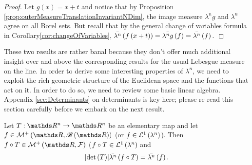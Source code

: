 \begin{proof}
Let $g\left(x\right)=x+t$ and notice that by Proposition \ref{prop:outerMeasureTranslationInvariantNDim},
the image measure $\lambda^{n}g$ and $\lambda^{n}$ agree on all
Borel sets. But recall that by the general change of variables formula
in Corollary\ref{cor:changeOfVariables}, $\bar{\lambda^{n}}\left(f\left(x+t\right)\right)=\bar{\lambda^{n}g}\left(f\right)=\bar{\lambda^{n}}\left(f\right).$
\end{proof}
These two results are rather banal because they don't offer much additional
insight over and above the corresponding results for the usual Lebesgue
measure on the line. In order to derive some interesting properties
of $\lambda^{n}$, we need to exploit the rich geometric structure
of the Euclidean space and the functions that act on it. In order
to do so, we need to review some basic linear algebra. Appendix \ref{sec:Determinants}
on determinants is key here; please re-read this section carefully
before we embark on the next result.
\begin{lem}
\label{lem:changeOfVariablesAffineElementary}Let $T:\R^{n}\to\R^{n}$
be an elementary map and let $f\in\mathcal{M}^{+}\left(\R,\borel\left(\R\right)\right)$
(or $f\in\mathcal{L}^{1}\left(\lambda^{n}\right)$). Then $f\circ T\in\mathcal{M}^{+}\left(\R,\F\right)$
($f\circ T\in\mathcal{L}^{1}\left(\lambda^{n}\right)$ and 
\[
\lvert\mathrm{det}\left(T\right)\rvert\bar{\lambda^{n}}\left(f\circ T\right)=\bar{\lambda^{n}}\left(f\right).
\]
\end{lem}

